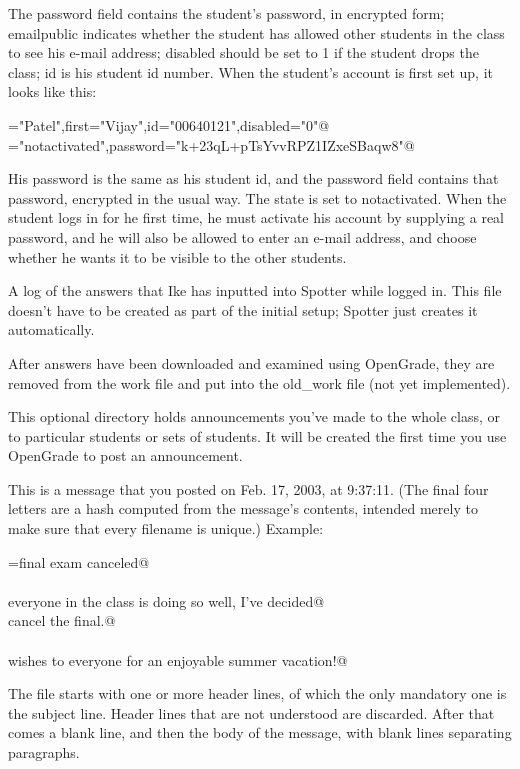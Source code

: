 \documentclass{doc}
\begin{document}
The password field contains the student's password, in encrypted form; emailpublic
indicates whether the student has allowed other students in the class to see his
e-mail address; disabled should be set to 1 if the student drops the class; id
is his student id number. When the student's account is first set up, it looks like
this:

\verb@last="Patel",first="Vijay",id="00640121",disabled="0"@\\
\verb@state="notactivated",password="k+23qL+pTsYvvRPZ1IZxeSBaqw8"@

His password is the same as his student id, and the password field contains that
password, encrypted in the usual way. The state is set to notactivated. When the
student logs in for he first time, he must activate his account by supplying a
real password, and he will also be allowed to enter an e-mail address, and choose
whether he wants it to be visible to the other students.

 A log of the answers that Ike has inputted into Spotter
while logged in. This file doesn't have to be created as part of the initial setup; Spotter just creates it automatically.

 After answers have been downloaded and examined using OpenGrade,
they are removed from the work file and put into the old\_work file (not yet
implemented).

This optional directory holds announcements you've made to the whole class, or to particular
students or sets of students. It will be created the first time you use OpenGrade to post
an announcement.

 This is a message that you posted on Feb. 17, 2003, at 9:37:11.
(The final four letters are a hash computed from the message's contents, intended merely to
make sure that every filename is unique.)
Example:

\verb@subject=final exam canceled@\\
\verb@@\\
\verb@Since everyone in the class is doing so well, I've decided@\\
\verb@to cancel the final.@\\
\verb@@\\
\verb@Best wishes to everyone for an enjoyable summer vacation!@

The file starts with one or more header lines, of which the only mandatory one is
the subject line. Header lines that are not understood are discarded. After that
comes a blank line, and then the body of the message, with blank lines separating
paragraphs.
\end{document}
